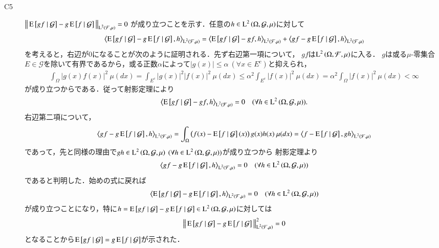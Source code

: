 \begin{prf}
\begin{description}
			\item[C5] $\left\|\, \operatorname{E} \left[ gf \ \middle|\ \mathcal{G} \right] - g\operatorname{E} \left[ f \ \middle|\ \mathcal{G} \right]\, \right\|_{\operatorname{L}^{2} \left(\mathcal{F},\mu\right)} = 0$
				が成り立つことを示す．任意の$h \in \operatorname{L}^{2} \left(\Omega, \mathcal{G},\mu\right)$に対して
				\begin{align}
					\inprod<\cexp{gf}{\mathcal{G}} - g\cexp{f}{\mathcal{G}}, h>_{\Lp{2}{\mathcal{F},\mu}} 
					= \inprod<\cexp{gf}{\mathcal{G}} - gf, h>_{\Lp{2}{\mathcal{F},\mu}} + \inprod<gf - g\cexp{f}{\mathcal{G}}, h>_{\Lp{2}{\mathcal{F},\mu}}
				\end{align}
				を考えると，右辺が0になることが次のように証明される．先ず右辺第一項について，
				$gf$は$\operatorname{L}^{2} \left(\Omega, \mathcal{F},\mu\right)$に入る．
				$g$は或る$\mu$-零集合$E \in \mathcal{G}$を除いて有界であるから，或る正数$\alpha$によって$|g(x)| \leq \alpha \ (\forall x \in E^c)$と抑えられ，
				\begin{align}
					\int_{\Omega} |g(x)f(x)|^2\ \mu(dx) = \int_{E^c} |g(x)|^2|f(x)|^2\ \mu(dx) \leq \alpha^2 \int_{E^c} |f(x)|^2\ \mu(dx) = \alpha^2 \int_{\Omega} |f(x)|^2\ \mu(dx) < \infty
				\end{align}
				が成り立つからである．従って射影定理により
				\begin{align}
					\inprod<\cexp{gf}{\mathcal{G}} - gf, h>_{\Lp{2}{\mathcal{F},\mu}} = 0 \quad (\forall h \in \Lp{2}{\Omega, \mathcal{G},\mu}).
				\end{align}
				右辺第二項について，
				\begin{align}
					\inprod<gf - g\cexp{f}{\mathcal{G}}, h>_{\Lp{2}{\mathcal{F},\mu}} = \int_{\Omega} \left( f(x) - \cexp{f}{\mathcal{G}}(x) \right) g(x)h(x)\ \mu(dx)
					= \inprod<f - \cexp{f}{\mathcal{G}}, gh>_{\Lp{2}{\mathcal{F},\mu}}
				\end{align}
				であって，先と同様の理由で$gh \in \operatorname{L}^{2} \left(\Omega, \mathcal{G},\mu\right) \ (\forall h \in \operatorname{L}^{2} \left(\Omega, \mathcal{G},\mu\right))$が成り立つから
				射影定理より
				\begin{align}
					\inprod<gf - g\cexp{f}{\mathcal{G}}, h>_{\Lp{2}{\mathcal{F},\mu}} = 0  \quad (\forall h \in \Lp{2}{\Omega, \mathcal{G},\mu})
				\end{align}
				であると判明した．始めの式に戻れば
				\begin{align}
					\inprod<\cexp{gf}{\mathcal{G}} - g\cexp{f}{\mathcal{G}}, h>_{\Lp{2}{\mathcal{F},\mu}} = 0  \quad (\forall h \in \Lp{2}{\Omega, \mathcal{G},\mu})
				\end{align}
				が成り立つことになり，特に$h = \operatorname{E} \left[ gf \ \middle|\ \mathcal{G} \right] - g\operatorname{E} \left[ f \ \middle|\ \mathcal{G} \right] \in \operatorname{L}^{2} \left(\Omega, \mathcal{G},\mu\right)$に対しては
				\begin{align}
					\left\|\, \operatorname{E} \left[ gf \ \middle|\ \mathcal{G} \right] - g\operatorname{E} \left[ f \ \middle|\ \mathcal{G} \right]\, \right\|_{\operatorname{L}^{2} \left(\mathcal{F},\mu\right)}^2 = 0
				\end{align}
				となることから$\operatorname{E} \left[ gf \ \middle|\ \mathcal{G} \right] = g\operatorname{E} \left[ f \ \middle|\ \mathcal{G} \right]$が示された．
			

\end{description}
\end{prf}
